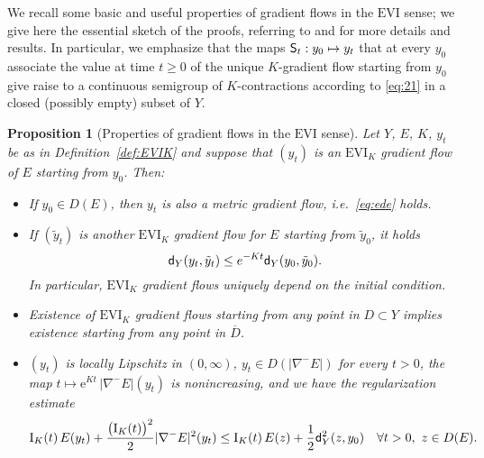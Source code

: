 \documentclass[reqno,11pt]{article}
\numberwithin{equation}{section}
\newcommand{\sfd}{{\sf d}}
\newcommand{\sfS}{{\sf S}}
\newcommand{\rme}{{\mathrm e}}
\newcommand{\EVI}[4]{\mathrm{EVI}_{#4}(#1,{#2}_W,#3)}
\newtheorem{proposition}[theorem]{Proposition}
\renewcommand{\EVI}{\ensuremath{\mathrm{EVI}}}
\begin{document}
We recall some basic and useful properties of gradient flows in the
$\EVI$ sense; we give here the essential sketch of the proofs,
referring to \cite[Chap.\ 4]{Ambrosio-Gigli-Savare08} and
\cite{Savare10} for more details and results. In particular, we
emphasize that the maps $\sfS_t:y_0\mapsto y_t$ that at every $y_0$
associate the value at time $t\ge0$ of the unique $K$-gradient flow
starting from $y_0$ give raise to a continuous semigroup of
$K$-contractions according to \eqref{eq:21} in a closed (possibly
empty) subset of $Y$.
%
\begin{proposition}[Properties of gradient flows in the $\EVI$ sense]\label{prop:evipropr}
Let $Y$, $E$, $K$, $y_t$ be as in Definition~\ref{def:EVIK}
 and suppose that $(y_t)$ is an $\EVI_K$ gradient flow of $E$ starting from
$y_0$. Then:
\begin{itemize}
\item[(i)] If $y_0\in D(E)$, then $y_t$ is also a metric gradient flow,
i.e.~\eqref{eq:ede} holds.
\item[(ii)] If $(\tilde y_t)$ is another $\EVI_K$ gradient flow for $E$ starting
from $\tilde{y}_0$, it holds
\begin{equation}
\sfd_Y(y_t,\tilde y_t)\leq e^{-Kt}\sfd_Y(y_0,\tilde y_0).\label{eq:21}
\end{equation}
In particular, $\EVI_K$ gradient flows uniquely depend on the
initial condition.
\item[(iii)]
Existence of $\EVI_K$ gradient flows starting from any point in
$D\subset Y$ implies existence starting from any point in $\overline
D$.
\item[(iv)] $(y_t)$ is locally Lipschitz in $(0,\infty)$,
  $y_t\in D(|\nabla^- E|)$ for every $t>0$, the map $t\mapsto \rme^{K
    t}\,|\nabla^-E|(y_t)$ is nonincreasing, and
  we have the regularization estimate
  \begin{equation}\label{eq:ultraEVI}
    \mathrm I_K(t)\,E(y_t)+\frac{\big(\mathrm I_K(t)\big)^2}2|\nabla^- E|^2(y_t)\leq
    \mathrm I_K(t)\,E(z)+\frac12
    \sfd_Y^2(z,y_0)\quad
    \forall t>0,\ z\in D(E).
  \end{equation}
\end{itemize}
\end{proposition}
\end{document}
